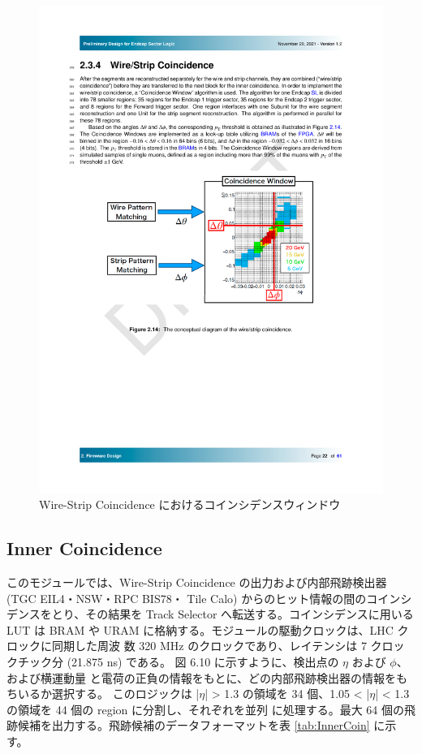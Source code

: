 \begin{figure} 
\centering
\includegraphics[width=16cm]{fig/SL/WireStrip_LUT.pdf}
\caption[Wire-Strip Coincidence におけるコインシデンスウィンドウ]{Wire-Strip Coincidence におけるコインシデンスウィンドウ}
\label{WireStrip_LUT}
\end{figure}

\subsection*{Inner Coincidence}
このモジュールでは、Wire-Strip Coincidence の出力および内部飛跡検出器 (TGC EIL4・NSW・RPC BIS78・ Tile Calo) からのヒット情報の間のコインシデンスをとり、その結果を Track Selector へ転送する。コインシデンスに用いる LUT は BRAM や URAM に格納する。モジュールの駆動クロックは、LHC クロックに同期した周波 数 320 MHz のクロックであり、レイテンシは 7 クロックチック分 (21.875 ns) である。
図 6.10 に示すように、検出点の $\eta$ および $\phi$、および横運動量 \pt と電荷の正負の情報をもとに、どの内部飛跡検出器の情報をもちいるか選択する。
このロジックは |$\eta$| > 1.3 の領域を 34 個、1.05 < |$\eta$| < 1.3 の領域を 44 個の region に分割し、それぞれを並列 に処理する。最大 64 個の飛跡候補を出力する。飛跡候補のデータフォーマットを表 \ref{tab:InnerCoin} に示す。

